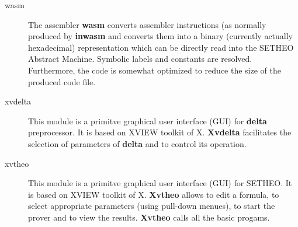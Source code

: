 \begin{description}
\item[wasm]
The assembler {\bf wasm} converts assembler instructions (as normally
produced by {\bf inwasm} and converts them into a binary
(currently actually hexadecimal) representation which can be directly
read into the SETHEO Abstract Machine.
Symbolic labels and constants are resolved. Furthermore, the
code is somewhat optimized to reduce the size of the produced code file.
 
\item[xvdelta]
This module is a primitve graphical user interface (GUI) for {\bf delta}
preprocessor.
It is based on XVIEW toolkit of X. {\bf Xvdelta} facilitates the selection
of parameters of {\bf delta} and to control its operation.

\item[xvtheo]
This module is a primitve graphical user interface (GUI) for SETHEO.
It is based on XVIEW toolkit of X. {\bf Xvtheo} allows to edit
a formula, to select appropriate parameters (using pull-down menues),
to start the prover and to view the results.
{\bf Xvtheo} calls all the basic progams.
\end{description}
